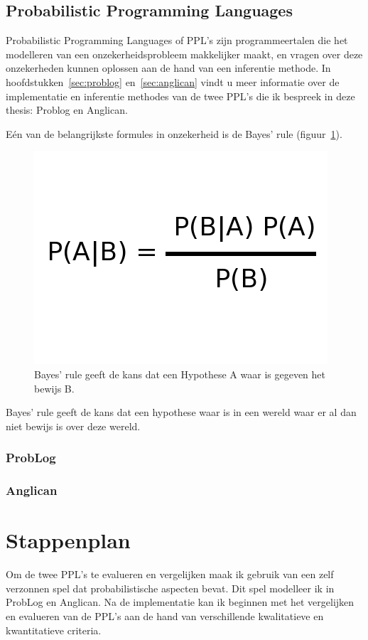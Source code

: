 \documentclass[12pt,a4paper,oneside]{book}
\begin{document}
\section{Probabilistic Programming Languages}
Probabilistic Programming Languages of PPL's zijn programmeertalen die het modelleren van een onzekerheidsprobleem makkelijker maakt, en vragen over deze onzekerheden kunnen oplossen aan de hand van een inferentie methode. In hoofdstukken~\ref{sec:problog} en~\ref{sec:anglican} vindt u meer informatie over de implementatie en inferentie methodes van de twee PPL's die ik bespreek in deze thesis: Problog en Anglican.

E\'{e}n van de belangrijkste formules in onzekerheid is de Bayes' rule (figuur~\ref{fig:bayes_rule}).
\begin{figure}
  \centering
    \includegraphics[height=55truemm]{bayes_rule}
  \caption{Bayes' rule geeft de kans dat een Hypothese A waar is gegeven het bewijs B.}
  \label{fig:bayes_rule}
\end{figure}
Bayes' rule geeft de kans dat een hypothese waar is in een wereld waar er al dan niet bewijs is over deze wereld.
\subsection{ProbLog}
\label{subsec:problog}
\subsection{Anglican}
\label{subsec:anglican}

\chapter{Stappenplan}
Om de twee PPL's te evalueren en vergelijken maak ik gebruik van een zelf verzonnen spel dat probabilistische aspecten bevat. Dit spel modelleer ik in ProbLog en Anglican. Na de implementatie kan ik beginnen met het vergelijken en evalueren van de PPL's aan de hand van verschillende kwalitatieve en kwantitatieve criteria.
\end{document}
